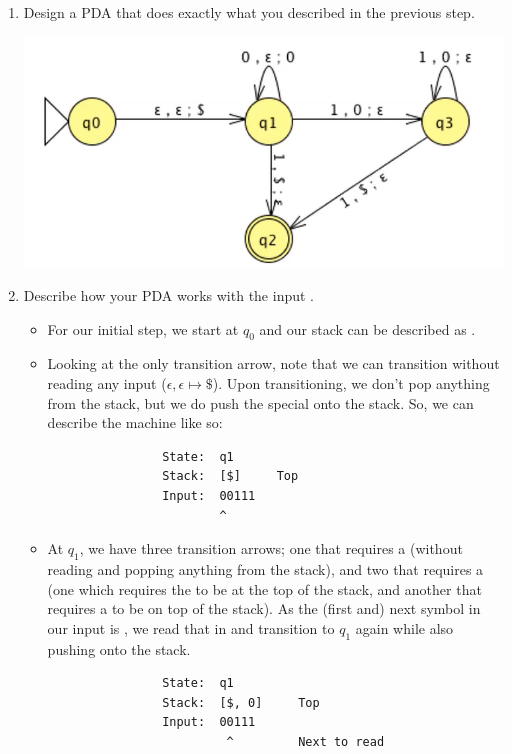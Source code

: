 \documentclass[letterpaper]{article}
\begin{document}
\begin{enumerate}
    \item Design a PDA that does exactly what you described in the previous step. 
    \begin{mdframed}[nobreak=true]
        \begin{center}
            \includegraphics[scale=0.7]{../assets/pda_1.png}
        \end{center}
    \end{mdframed}

    \item Describe how your PDA works with the input .
    \begin{mdframed}[]
        \begin{itemize}
            \item For our initial step, we start at $q_0$ and our stack can be described as \code{[]}.
            \item Looking at the only transition arrow, note that we can transition without reading any input ($\epsilon, \epsilon \mapsto \$$). Upon transitioning, we don't pop anything from the stack, but we do push the special \code{\$} onto the stack. So, we can describe the machine like so: 
            \begin{verbatim}
                State:  q1
                Stack:  [$]     Top 
                Input:  00111
                        ^
            \end{verbatim}

            \item At $q_1$, we have three transition arrows; one that requires a  (without reading and popping anything from the stack), and two that requires a  (one which requires the \code{\$} to be at the top of the stack, and another that requires a  to be on top of the stack). As the (first and) next symbol in our input is , we read that in and transition to $q_1$ again while also pushing  onto the stack. 
            \begin{verbatim}
                State:  q1
                Stack:  [$, 0]     Top 
                Input:  00111
                         ^         Next to read
            \end{verbatim}


\end{itemize}
\end{mdframed}
\end{enumerate}
\end{document}
